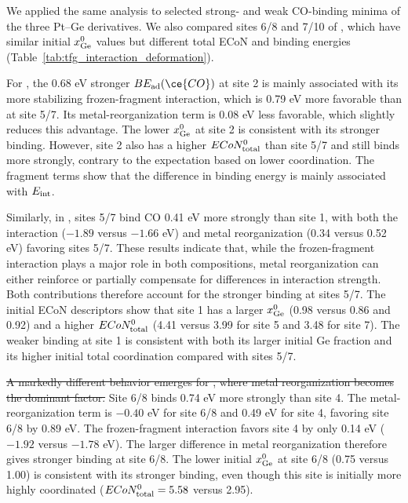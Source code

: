 {We applied the same analysis to
selected strong- and weak CO-binding minima of the three Pt--Ge derivatives. We
also compared sites 6/8 and 7/10 of , which have similar
initial $x_{\rm Ge}^{0}$ values but different total ECoN and binding energies
(Table~\ref{tab:tfg_interaction_deformation}).}

For , the 0.68 eV stronger $BE_{\rm ad}(\ce{CO})$ at site 2 is mainly associated with its more stabilizing frozen-fragment interaction, which is 0.79 eV more favorable than at site 5/7. Its metal-reorganization term is 0.08 eV less favorable, which slightly reduces this advantage. The lower $x_{\rm Ge}^{0}$ at site 2 is consistent with its stronger binding. However, site 2 also has a higher $ECoN_{\rm total}^{0}$ than site 5/7 and still binds  more strongly, contrary to the expectation based on lower coordination. The fragment terms show that the difference in binding energy is mainly associated with $E_{\rm int}$.

Similarly, in , sites 5/7 bind CO 0.41 eV more strongly than site 1, with both the interaction ($-1.89$ versus $-1.66$ eV) and metal reorganization (0.34 versus 0.52 eV) favoring sites 5/7. These results indicate that, while the frozen-fragment interaction plays a major role in both compositions, metal reorganization can either reinforce or partially compensate for differences in interaction strength. Both contributions therefore account for the stronger binding at sites 5/7. The initial ECoN descriptors show that site 1 has a larger $x_{\rm Ge}^{0}$ (0.98 versus 0.86 and 0.92) and a higher $ECoN_{\rm total}^{0}$ (4.41 versus 3.99 for site 5 and 3.48 for site 7). The weaker binding at site 1 is consistent with both its larger initial Ge fraction and its higher initial total coordination compared with sites 5/7.

\sout{A markedly different behavior emerges for , where metal reorganization becomes the dominant factor.}   {Site 6/8 binds  0.74 eV more strongly than site 4. The metal-reorganization term is $-0.40$ eV for site 6/8 and 0.49 eV for site 4, favoring site 6/8 by 0.89 eV. The frozen-fragment interaction favors site 4 by only 0.14 eV ($-1.92$ versus $-1.78$ eV). The larger difference in metal reorganization therefore gives stronger  binding at site 6/8. The lower initial $x_{\rm Ge}^{0}$ at site 6/8 (0.75 versus 1.00) is consistent with its stronger binding, even though this site is initially more highly coordinated ($ECoN_{\rm total}^{0}=5.58$ versus 2.95).}

